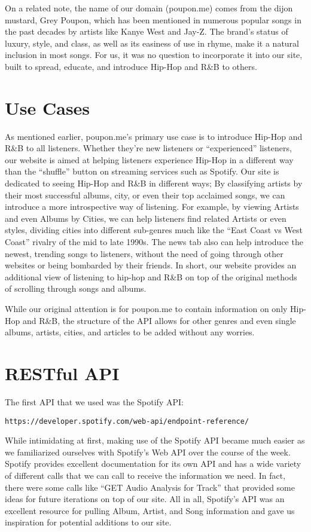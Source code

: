 \documentclass{scrartcl}
\begin{document}
On a related note, the name of our domain (poupon.me) comes from the dijon mustard, Grey Poupon, which has been mentioned in numerous popular songs in the past decades by artists like Kanye West and Jay-Z. The brand’s status of luxury, style, and class, as well as its easiness of use in rhyme, make it a natural inclusion in most songs. For us, it was no question to incorporate it into our site, built to spread, educate, and introduce Hip-Hop and R\&B to others.

\section{Use Cases}
\indent As mentioned earlier, poupon.me’s primary use case is to introduce Hip-Hop and R\&B to all listeners. Whether they’re new listeners or “experienced” listeners, our website is aimed at helping listeners experience Hip-Hop in a different way than the “shuffle” button on streaming services such as Spotify. Our site is dedicated to seeing Hip-Hop and R\&B in different ways; By classifying artists by their most successful albums, city, or even their top acclaimed songs, we can introduce a more introspective way of listening. For example, by viewing Artists and even Albums by Cities, we can help listeners find related Artists or even styles, dividing cities into different sub-genres much like the “East Coast vs West Coast” rivalry of the mid to late 1990s. The news tab also can help introduce the newest, trending songs to listeners, without the need of going through other websites or being bombarded by their friends. In short, our website provides an additional view of listening to hip-hop and R\&B on top of the original methods of scrolling through songs and albums. 

While our original attention is for poupon.me to contain information on only Hip-Hop and R\&B, the structure of the API allows for other genres and even single albums, artists, cities, and articles to be added without any worries.

\section{RESTful API}
The first API that we used was the Spotify API: \begin{verbatim}https://developer.spotify.com/web-api/endpoint-reference/\end{verbatim}

While intimidating at first, making use of the Spotify API became much easier as we familiarized ourselves with Spotify’s Web API over the course of the week. Spotify provides excellent documentation for its own API and has a wide variety of different calls that we can call to receive the information we need. In fact, there were some calls like “GET Audio Analysis for Track” that provided some ideas for future iterations on top of our site. All in all, Spotify’s API was an excellent resource for pulling Album, Artist, and Song information and gave us inspiration for potential additions to our site.
\end{document}
